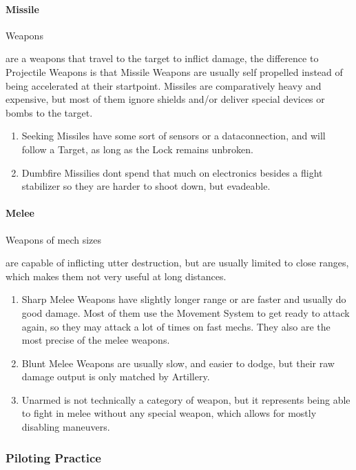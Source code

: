         \paragraph{Missile} Weapons \par are a weapons that travel to the target to inflict damage, the difference
        to Projectile Weapons is that Missile Weapons are usually self propelled instead of being accelerated at their
        startpoint.
        Missiles are comparatively heavy and expensive, but most of them ignore shields and/or deliver
        special devices or bombs to the target.
        \begin{enumerate}[label= -]
            \item{Seeking} Missiles have some sort of sensors or a dataconnection, and will follow a Target, as long as the Lock
            remains unbroken.
            \item{Dumbfire} Missilies dont spend that much on electronics besides a flight stabilizer so they are
            harder to shoot down, but evadeable.
        \end{enumerate}
        \paragraph{Melee} Weapons of mech sizes \par are capable of inflicting utter destruction, but are usually
        limited to close ranges, which makes them not very useful at long distances.
        \begin{enumerate}[label= -]
            \item{Sharp} Melee Weapons have slightly longer range or are faster and usually do good damage.
            Most of them
            use the Movement System to get ready to attack again, so they may attack a lot of times on fast mechs.
            They also are the most precise of the melee weapons.
            \item{Blunt} Melee Weapons are usually slow, and easier to dodge, but their raw damage output is only
            matched by Artillery.
            \item{Unarmed} is not technically a category of weapon, but it represents being able to fight in melee
            without any special weapon, which allows for mostly disabling maneuvers.
        \end{enumerate}
    \subsubsection{Piloting Practice}
